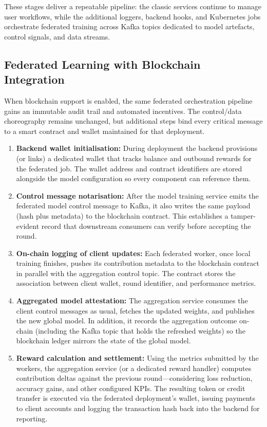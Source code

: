 These stages deliver a repeatable pipeline: the classic services continue to manage user workflows, while the additional loggers, backend hooks, and Kubernetes jobs orchestrate federated training across Kafka topics dedicated to model artefacts, control signals, and data streams.

\subsection{Federated Learning with Blockchain Integration}
\label{subsec:federated_blockchain}

When blockchain support is enabled, the same federated orchestration pipeline gains an immutable audit trail and automated incentives. The control/data choreography remains unchanged, but additional steps bind every critical message to a smart contract and wallet maintained for that deployment.

\begin{enumerate}
    \item \textbf{Backend wallet initialisation:} During deployment the backend provisions (or links) a dedicated wallet that tracks balance and outbound rewards for the federated job. The wallet address and contract identifiers are stored alongside the model configuration so every component can reference them.

    \item \textbf{Control message notarisation:} After the model training service emits the federated model control message to Kafka, it also writes the same payload (hash plus metadata) to the blockchain contract. This establishes a tamper-evident record that downstream consumers can verify before accepting the round.

    \item \textbf{On-chain logging of client updates:} Each federated worker, once local training finishes, pushes its contribution metadata to the blockchain contract in parallel with the aggregation control topic. The contract stores the association between client wallet, round identifier, and performance metrics.

    \item \textbf{Aggregated model attestation:} The aggregation service consumes the client control messages as usual, fetches the updated weights, and publishes the new global model. In addition, it records the aggregation outcome on-chain (including the Kafka topic that holds the refreshed weights) so the blockchain ledger mirrors the state of the global model.

    \item \textbf{Reward calculation and settlement:} Using the metrics submitted by the workers, the aggregation service (or a dedicated reward handler) computes contribution deltas against the previous round—considering loss reduction, accuracy gains, and other configured KPIs. The resulting token or credit transfer is executed via the federated deployment’s wallet, issuing payments to client accounts and logging the transaction hash back into the backend for reporting.
\end{enumerate}

